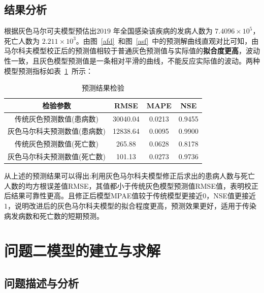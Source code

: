 \documentclass{whutmod}
\begin{document}
   \subsection{结果分析}


	根据灰色马尔可夫模型预估出$ 2019$ 年全国感染该疾病的发病人数为 $7.4096\times  10^{5}$，死亡人数为 $2.211\times  10^{3}
	$。由图~\ref{afd}~和图~\ref{asf}~中的预测解曲线直观对比可知，由马尔科夫模型校正后的预测值相较于普通灰色预测值与实际值的\textbf{拟合度更高}，波动性一致，且灰色模型预测值是一条相对平滑的曲线，不能反应实际值的波动。两种模型预测指标如表~\ref{jjj}~所示：

 \begin{table}[H]
	\centering\caption{预测结果检验}\label{jjj}
	\begin{tabular}{cccc}
		\toprule[1.5pt]
		\multicolumn{1}{m{6cm}}{\centering 检验参数}
		& \multicolumn{1}{m{2cm}}{\centering RMSE}
		& \multicolumn{1}{m{2cm}}{\centering MAPE}
		& \multicolumn{1}{m{2cm}}{\centering NSE}
		\\
			\midrule[0.5pt]	
	    传统灰色预测数值(患病数) &   30040.04 &  0.0213 & 0.9455\\ 
		灰色马尔科夫预测数值(患病数)&  12838.64  &  0.0095  &  0.9900 \\ 
		传统灰色预测数值(死亡数) &  265.88   & 0.0628   &0.8178  \\
		灰色马尔科夫预测数值(死亡数) &   101.13 &   0.0273 & 0.9736  \\   
		\bottomrule[1.5pt]	
	\end{tabular}
\end{table} 


    从上述的预测结果可以得出:利用灰色马尔科夫模型修正后求出的患病人数与死亡人数的均方根误差值RMSE，其值都小于传统灰色模型预测值RMSE值，表明校正后结果可靠性更高。且修正后模型MPAE值较于传统模型更接近$0$，NSE值更接近 $1$，说明改进后的灰色马尔科夫模型的拟合程度更高，预测效果更好，适用于传染病发病数和死亡数的短期预测。

	  
	  \section{问题二模型的建立与求解}
	  \subsection{问题描述与分析}
\end{document}
